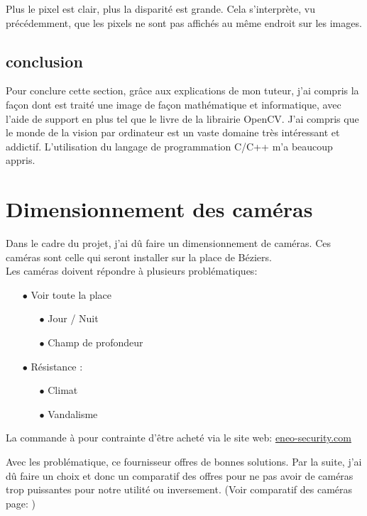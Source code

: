 \documentclass[12pt, french]{report}
\begin{document}
Plus le pixel est clair, plus la disparité est grande. Cela s'interprète, vu précédemment, que les pixels ne sont pas affichés au même endroit sur les images.

\subsection{conclusion}

Pour conclure cette section, grâce aux explications de mon tuteur, j'ai compris la façon dont est traité une image de façon mathématique et informatique, avec l'aide de support en plus tel que le livre de la librairie OpenCV. J'ai compris que le monde de la vision par ordinateur est un vaste domaine très intéressant et addictif. L'utilisation du langage de programmation C/C++ m'a beaucoup appris.



\newpage
\section{Dimensionnement des caméras}

Dans le cadre du projet, j'ai dû faire un dimensionnement de caméras. Ces caméras sont celle qui seront installer sur la place de Béziers.\\

Les caméras doivent répondre à plusieurs problématiques:
\begin{itemize}
    \item[$\bullet$] Voir toute la place
    \begin{itemize}
        \item[$\bullet$] Jour / Nuit
        \item[$\bullet$] Champ de profondeur
    \end{itemize}
    \item[$\bullet$] Résistance :
    \begin{itemize}
        \item[$\bullet$] Climat
        \item[$\bullet$]Vandalisme
    \end{itemize}
\end{itemize}

La commande à pour contrainte d'être acheté via le site web: \href{eneo-security.com}{eneo-security.com}\newline

Avec les problématique, ce fournisseur offres de bonnes solutions. Par la suite, j'ai dû faire un choix et donc un comparatif des offres pour ne pas avoir de caméras trop puissantes pour notre utilité ou inversement.  (Voir comparatif des caméras page: \pageref{Comparatif.pdf})
\end{document}
